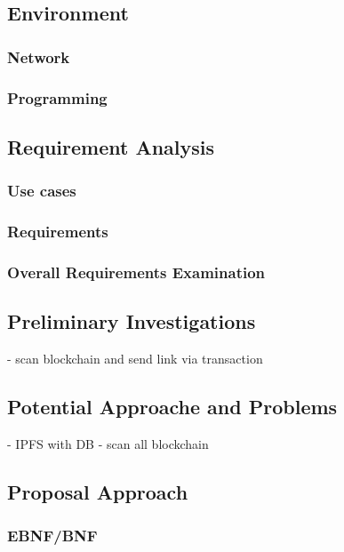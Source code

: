 \subsection{Environment}

\subsubsection{Network}
\subsubsection{Programming}

\subsection{Requirement Analysis}

\subsubsection{Use cases}
\subsubsection{Requirements}
\subsubsection{Overall Requirements Examination}

\subsection{Preliminary Investigations}
- scan blockchain and send link via transaction
\subsection{Potential Approache and Problems}
- IPFS with DB
- scan all blockchain
\subsection{Proposal Approach}

\subsubsection{EBNF/BNF}


